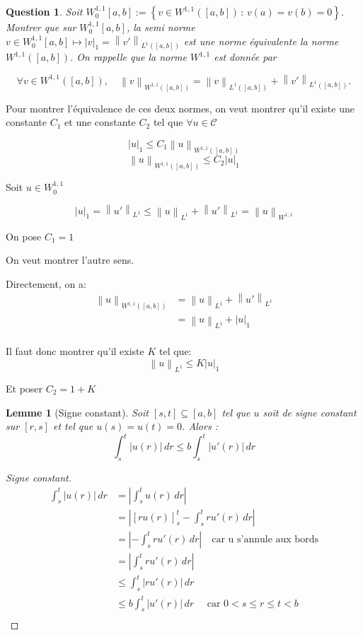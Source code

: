 \documentclass{article}
\newcommand{\Set}[1]{ \left\{ #1 \right\} }
\newcommand{\Abs}[1]{ \left| #1 \right| }
\newcommand{\Sobolev}[1]{ W^{1,1}\left( #1 \right) }
\newcommand{\Lebesgue}[1]{ L^{1}\left( #1 \right) }
\newcommand{\Norm}[2]{ \left\| #1 \right\|_{#2} }
\newcommand{\Integral}[4]{ \int_{#1}^{#2} #3 \, d#4 }
\newtheorem{question}{Question}[subsection]
\newenvironment{answer}
  {\color{blue}}
  {}
\newcommand{\QuestionAnswer}[2]{
    \begin{question}
        #1
    \end{question}
    \begin{answer}
        #2
    \end{answer}
}
\newtheorem{lemma}{Lemme}
\newtheorem{proof}{Preuve}
\newcommand{\SobolevSpace}{W^{1,1}}
\newcommand{\SobolevSpaceZero}{W^{1,1}_0}
\newcommand{\SetC}{\mathcal{C}}
\begin{document}
\QuestionAnswer{
    Soit $\SobolevSpaceZero[a, b] := \Set{ v \in \Sobolev{[a, b]} \, : \, v(a) = v(b) = 0}$. Montrer que sur 
    $\SobolevSpaceZero[a, b]$, la semi norme $v \in \SobolevSpaceZero[a, b] \mapsto \Abs{v}_1 = \Norm{v'}{\Lebesgue{[a,b]}}$ est une norme 
    équivalente la norme $\Sobolev{[a, b]}$. On rappelle que la norme $\SobolevSpace$ est donnée par
    
    $$\forall v \in \Sobolev{[a, b]}, \quad \Norm{v}{\Sobolev{[a,b]}} = \Norm{v}{\Lebesgue{[a,b]}} + \Norm{v'}{\Lebesgue{[a,b]}}.$$
}{
    Pour montrer l'équivalence de ces deux normes, on veut montrer qu'il existe une constante $C_1$ et une constante $C_2$ tel que $\forall u \in \SetC$

    $$\Abs{u}_1 \leq C_1 \Norm{u}{\Sobolev{[a,b]}}$$
    $$\Norm{u}{\Sobolev{[a,b]}} \leq C_2 \Abs{u}_1$$

    Soit $u \in W^{1,1}_0$

    $$\Abs{u}_1 = \Norm{u'}{L^1} \leq \Norm{u}{L^1} + \Norm{u'}{L^1} = \Norm{u}{W^{1,1}}$$

    On pose $C_1 = 1$

    On veut montrer l'autre sens.\newline

    Directement, on a:
    \begin{align*}
        \Norm{u}{\Sobolev{[a,b]}} &= \Norm{u}{L^1} + \Norm{u'}{L^1} \\
        &= \Norm{u}{L^1} + \Abs{u}_1 \\
    \end{align*}

    Il faut donc montrer qu'il existe $K$ tel que:
    $$\Norm{u}{L^1} \leq K \Abs{u}_1$$

    Et poser $C_2 = 1 + K$

    \begin{lemma}[Signe constant]
        Soit $[s,t] \subseteq [a,b]$ tel que $u$ soit de signe constant sur $[r,s]$ et tel que $u(s)=u(t)=0$.
        Alors :
        $$\Integral{s}{t}{\Abs{u(r)}}{r} \leq b\Integral{s}{t}{\Abs{u'(r)}}{r}$$
    \end{lemma}
    \begin{proof}[Signe constant]
        \begin{align*}
            \Integral{s}{t}{\Abs{u(r)}}{r} &= \Abs{\Integral{s}{t}{u(r)}{r}}\\
            &= \Abs{[r u(r)]^t_s - \Integral{s}{t}{r u'(r)}{r}}\\
            &= \Abs{ - \Integral{s}{t}{r u'(r)}{r}} \quad \text{car u s'annule aux bords}\\
            &= \Abs{ \Integral{s}{t}{r u'(r)}{r}}\\
            &\leq  \Integral{s}{t}{\Abs{r u'(r)}}{r}\\
            &\leq b \Integral{s}{t}{\Abs{u'(r)}}{r} \quad \text{ car } 0 < s \leq  r \leq  t < b\\
        \end{align*}
    \end{proof}

}
\end{document}
